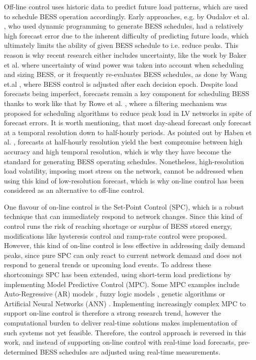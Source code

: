 Off-line control uses historic data to predict future load patterns, which are used to schedule BESS operation accordingly.
Early approaches, e.g. by Oudalov et al. \cite{Oudalov2007}, who used dynamic programming to generate BESS schedules, had a relatively high forecast error due to the inherent difficulty of predicting future loads, which ultimately limits the ability of given BESS schedule to i.e. reduce peaks.
This reason is why recent research either includes uncertainty, like the work by Baker et al. \cite{Baker2017} where uncertainty of wind power was taken into account when scheduling and sizing BESS, or it frequently re-evaluates BESS schedules, as done by Wang et.al \cite{Wang2014a}, where BESS control is adjusted after each decision epoch.
Despite load forecasts being imperfect, forecasts remain a key component for scheduling BESS thanks to work like that by Rowe et al. \cite{Rowe2014a}, where a filtering mechanism was proposed for scheduling algorithms to reduce peak load in LV networks in spite of forecast errors.
It is worth mentioning, that most day-ahead forecast only forecast at a temporal resolution down to half-hourly periods.
As pointed out by Haben et al. \cite{Poghosyan2014, Haben2014}, forecasts at half-hourly resolution yield the best compromise between high accuracy and high temporal resolution, which is why they have become the standard for generating BESS operating schedules.
Nonetheless, high-resolution load volatility, imposing most stress on the network, cannot be addressed when using this kind of low-resolution forecast, which is why on-line control has been considered as an alternative to off-line control.

One flavour of on-line control is the Set-Point Control (SPC), which is a robust technique that can immediately respond to network changes.
Since this kind of control runs the risk of reaching shortage or surplus of BESS stored energy, modifications like hysteresis control \cite{Gybel2012} and ramp-rate control \cite{Such2012} were proposed.
However, this kind of on-line control is less effective in addressing daily demand peaks, since pure SPC can only react to current network demand and does not respond to general trends or upcoming load events.
To address these shortcomings SPC has been extended, using short-term load predictions by implementing Model Predictive Control (MPC).
Some MPC examples include Auto-Regressive (AR) models \cite{Li2009, Nie2011}, fuzzy logic models \cite{Sannomiya2001, Chen2013a}, genetic algorithms \cite{Xia2015a, Liu2015} or Artificial Neural Networks (ANN) \cite{Kalogirou2014, Quan2014, Lee2014, Pezeshki2014, Vaz2016, Reihani2016, Xiao2017}.
Implementing increasingly complex MPC to support on-line control is therefore a strong research trend, however the computational burden to deliver real-time solutions makes implementation of such systems not yet feasible.
Therefore, the control approach is reversed in this work, and instead of supporting on-line control with real-time load forecasts, pre-determined BESS schedules are adjusted using real-time measurements.

